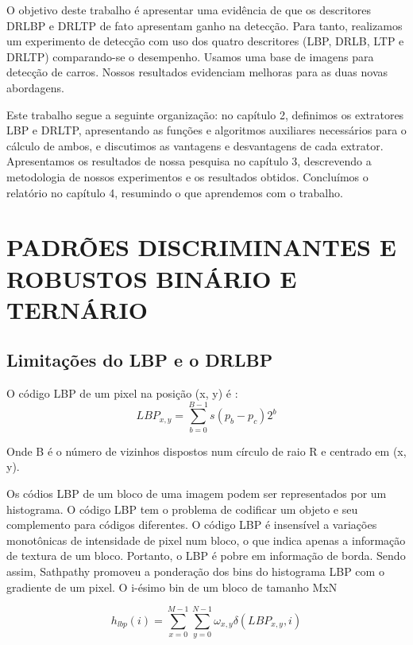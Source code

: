 \documentclass[a4paper,twocolumn]{article}
\begin{document}
O objetivo deste trabalho é apresentar uma evidência de que os descritores DRLBP e DRLTP  de fato apresentam ganho na detecção. Para tanto, realizamos um experimento de detecção com uso dos quatro descritores (LBP, DRLB, LTP e DRLTP) comparando-se o desempenho. Usamos uma base de imagens para detecção de carros. Nossos resultados evidenciam melhoras para as duas novas abordagens.

Este trabalho segue a seguinte organização: no capítulo 2, definimos os extratores LBP e DRLTP, apresentando as funções e algoritmos auxiliares necessários para o cálculo de ambos, e discutimos as vantagens e desvantagens de cada extrator. Apresentamos os resultados de nossa pesquisa no capítulo 3, descrevendo a metodologia de nossos experimentos e os resultados obtidos. Concluímos o relatório no capítulo 4, resumindo o que aprendemos com o trabalho.


\section{PADRÕES DISCRIMINANTES E ROBUSTOS BINÁRIO E TERNÁRIO}

\subsection{Limitações do LBP e o DRLBP}

O código LBP de um pixel na posição (x, y) é \cite{ojala_2002}:
\begin{equation}
    \label{eq:target_cost}
    LBP_{x,y} = \displaystyle\sum_{b=0}^{B - 1} s(p_{b} - p_{c})2^b
\end{equation}

Onde B é o número de vizinhos dispostos num círculo de raio R e centrado em (x, y). 

Os códios LBP de um bloco de uma imagem podem ser representados por um histograma. O código LBP tem o problema de codificar um objeto e seu complemento para códigos diferentes. O código LBP é insensível a variações monotônicas de intensidade de pixel num bloco, o que indica apenas a informação de textura de um bloco. Portanto, o LBP é pobre em informação de borda. Sendo assim, Sathpathy promoveu a ponderação dos bins do histograma LBP com o gradiente de um pixel. O i-ésimo bin de um bloco de tamanho MxN

\begin{equation}
    \label{eq:target_cost}
    h_{lbp}(i) = \displaystyle\sum_{x=0}^{M - 1} \sum_{y=0}^{N - 1} \omega_{x,y}\delta(LBP_{x,y}, i)
\end{equation}
\end{document}
